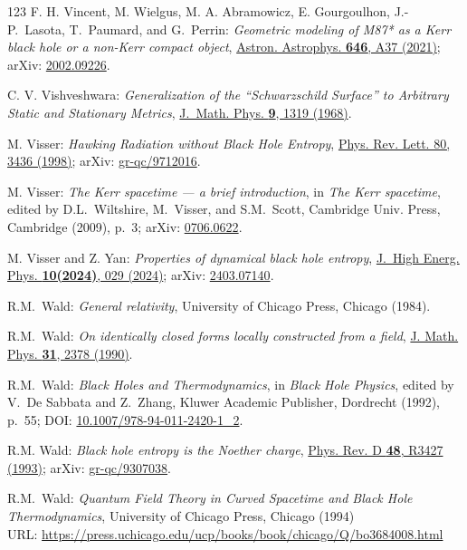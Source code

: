 \begin{thebibliography}{123}
F. H. Vincent, M. Wielgus, M. A. Abramowicz, E. Gourgoulhon, J.-P.~Lasota, T.~Paumard,
and G.~Perrin:
{\em Geometric modeling of M87* as a Kerr black hole or a non-Kerr compact object},
\href{https://doi.org/10.1051/0004-6361/202037787}{Astron. Astrophys. {\bf 646}, A37 (2021)};
arXiv: \href{https://arxiv.org/abs/2002.09226}{2002.09226}.

C. V. Vishveshwara:
{\em Generalization of the ``Schwarzschild Surface'' to Arbitrary Static and Stationary Metrics},
\href{https://doi.org/10.1063/1.1664717}{J.~Math. Phys. {\bf 9}, 1319 (1968)}.

M. Visser: {\em Hawking Radiation without Black Hole Entropy},
\href{https://doi.org/10.1103/PhysRevLett.80.3436}{Phys. Rev. Lett. 80, 3436 (1998)};
arXiv: \href{https://arxiv.org/abs/gr-qc/9712016}{gr-qc/9712016}.

M. Visser: {\em The Kerr spacetime --- a brief introduction},
in {\em The Kerr spacetime}, edited by D.L.~Wiltshire, M.~Visser, and S.M.~Scott,
Cambridge Univ. Press, Cambridge (2009), p.~3;
arXiv: \href{https://arxiv.org/abs/0706.0622}{0706.0622}.

M. Visser and Z. Yan:
{\em Properties of dynamical black hole entropy},
\href{https://doi.org/10.1007/JHEP10(2024)029}{J.~High Energ. Phys. {\bf 10(2024)}, 029 (2024)};
arXiv: \href{https://arxiv.org/abs/2403.07140}{2403.07140}.

R.M.~Wald:
{\em General relativity},
University of Chicago Press, Chicago (1984).

R.M.~Wald:
{\em On identically closed forms locally constructed from a field},
\href{https://doi.org/10.1063/1.528839}{J. Math. Phys. {\bf 31}, 2378 (1990)}.

R.M.~Wald:
{\em Black Holes and Thermodynamics},
in {\em Black Hole Physics}, edited by V.~De Sabbata and Z.~Zhang,
Kluwer Academic Publisher, Dordrecht (1992), p.~55;
DOI: \href{https://doi.org/10.1007/978-94-011-2420-1_2}{10.1007/978-94-011-2420-1\_2}.

R.M. Wald:
{\em Black hole entropy is the Noether charge},
\href{https://doi.org/10.1103/PhysRevD.48.R3427}{Phys. Rev. D {\bf 48}, R3427 (1993)};
arXiv: \href{https://arxiv.org/abs/gr-qc/9307038}{gr-qc/9307038}.

R.M.~Wald:
{\em Quantum Field Theory in Curved Spacetime and Black Hole Thermodynamics},
University of Chicago Press, Chicago (1994)\\
URL: \url{https://press.uchicago.edu/ucp/books/book/chicago/Q/bo3684008.html}


\end{thebibliography}
